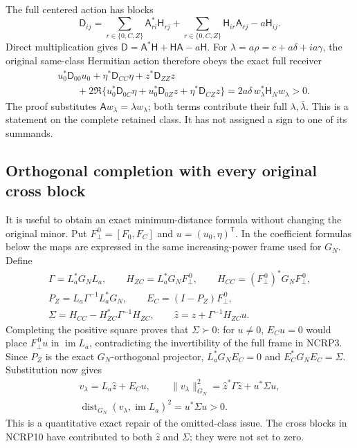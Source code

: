 \documentclass[11pt,a4paper]{article}
\begin{document}
The full centered action has blocks
\[
 \mathsf D_{ij}
 =\sum_{r\in\{0,C,Z\}}\mathsf A_{ri}^*\mathsf H_{rj}
  +\sum_{r\in\{0,C,Z\}}\mathsf H_{ir}\mathsf A_{rj}
  -a\mathsf H_{ij}.
 \tag{NCRP11}
\]
Direct multiplication gives
$\mathsf D=\mathsf A^*\mathsf H+\mathsf H\mathsf A-a\mathsf H$.
For $\lambda=a\rho=c+a\delta+ia\gamma$, the original same-class
Hermitian action therefore obeys the exact full receiver
\[
 \begin{split}
 &u_0^*\mathsf D_{00}u_0+\eta^*\mathsf D_{CC}\eta
       +z^*\mathsf D_{ZZ}z\\
 &\qquad+
 2\Re\{u_0^*\mathsf D_{0C}\eta+
                  u_0^*\mathsf D_{0Z}z+
                  \eta^*\mathsf D_{CZ}z\}
       =2a\delta\, w_\lambda^*\mathsf H_Nw_\lambda>0.
 \end{split}                                                     \tag{NCRP12}
\]
The proof substitutes $\mathsf Aw_\lambda=\lambda w_\lambda$;
both terms contribute their full $\lambda,\bar\lambda$.
This is a statement on the complete retained class. It has not
assigned a sign to one of its summands.

\subsection{Orthogonal completion with every original cross block}

It is useful to obtain an exact minimum-distance formula without
changing the original minor. Put
$F_\perp^{\,0}=[F_0,F_C]$ and $u=(u_0,\eta)^{\mathsf T}$.
In the coefficient formulas below the maps are expressed in the
same increasing-power frame used for $G_N$. Define
\[
 \begin{gathered}
 \Gamma=L_a^*G_NL_a,\qquad
 H_{ZC}=L_a^*G_NF_\perp^{\,0},\qquad
 H_{CC}=(F_\perp^{\,0})^*G_NF_\perp^{\,0},\\
 P_Z=L_a\Gamma^{-1}L_a^*G_N,\qquad
 E_C=(I-P_Z)F_\perp^{\,0},\\
 \Sigma=H_{CC}-H_{ZC}^*\Gamma^{-1}H_{ZC},\qquad
 \widehat z=z+\Gamma^{-1}H_{ZC}u .
 \end{gathered}                                                   \tag{NCRP13}
\]
Completing the positive square proves that $\Sigma\succ0$:
for $u\ne0$, $E_Cu=0$ would place $F_\perp^{\,0}u$ in
$\operatorname{im}L_a$, contradicting the invertibility of
the full frame in NCRP3. Since $P_Z$ is the exact $G_N$-orthogonal
projector, $L_a^*G_NE_C=0$ and $E_C^*G_NE_C=\Sigma$.
Substitution now gives
\[
 \begin{gathered}
 v_\lambda=L_a\widehat z+E_Cu,\qquad
 \|v_\lambda\|_{G_N}^2
       =\widehat z^*\Gamma\widehat z+u^*\Sigma u,\\
 \operatorname{dist}_{G_N}(v_\lambda,\operatorname{im}L_a)^2
       =u^*\Sigma u>0.
 \end{gathered}                                                   \tag{NCRP14}
\]
This is a quantitative exact repair of the omitted-class issue.
The cross blocks in NCRP10 have contributed to both $\widehat z$
and $\Sigma$; they were not set to zero.
\end{document}
